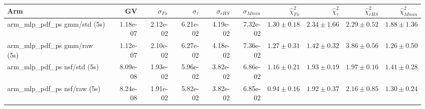 \begin{tabular}{lrrrrrrrrr}
\toprule
Arm & GV & $\sigma_{Fx}$ & $\sigma_{\tau}$ & $\sigma_{rHS}$ & $\sigma_{Mmin}$ & $\hat\chi^2_{Fx}$ & $\hat\chi^2_{\tau}$ & $\hat\chi^2_{rHS}$ & $\hat\chi^2_{Mmin}$ \\
\midrule
arm_mlp_pdf_ps gmm/std (5s) & 1.18e-07 & 2.12e-02 & 6.21e-02 & 4.19e-02 & 7.32e-02 & $1.30\pm0.18$ & $2.34\pm1.66$ & $2.29\pm0.52$ & $1.88\pm1.36$ \\
arm_mlp_pdf_ps gmm/raw (5s) & 1.12e-07 & 2.10e-02 & 6.27e-02 & 4.18e-02 & 7.36e-02 & $1.27\pm0.31$ & $1.42\pm0.32$ & $3.86\pm0.56$ & $1.26\pm0.50$ \\
arm_mlp_pdf_ps nsf/std (5s) & 8.09e-08 & 1.93e-02 & 5.96e-02 & 3.82e-02 & 6.86e-02 & $1.16\pm0.21$ & $1.93\pm0.19$ & $1.97\pm0.16$ & $1.41\pm0.28$ \\
arm_mlp_pdf_ps nsf/raw (5s) & 8.24e-08 & 1.91e-02 & 5.82e-02 & 3.82e-02 & 6.85e-02 & $0.94\pm0.16$ & $1.92\pm0.37$ & $2.16\pm0.85$ & $1.30\pm0.24$ \\
\bottomrule
\end{tabular}
